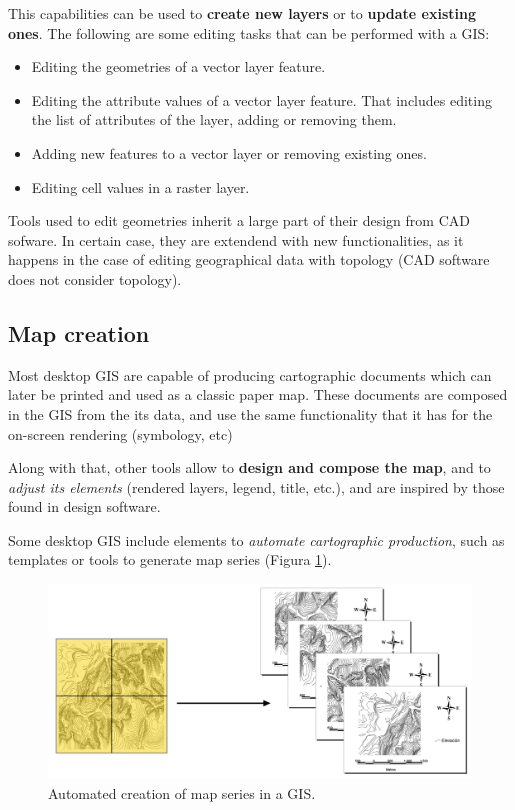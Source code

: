 This capabilities can be used to \textbf{create new layers} or to \textbf{update existing ones}. The following are some editing tasks that can be performed with a GIS:

\begin{itemize}
\item Editing the geometries of a vector layer feature.
\item Editing the attribute values of a vector layer feature. That includes editing the list of attributes of the layer, adding or removing them.
\item Adding new features to a vector layer or removing existing ones.
\item Editing cell values in a raster layer.
\end{itemize}

Tools used to edit geometries inherit a large part of their design from CAD sofware. In certain case, they are extendend with new functionalities, as it happens in the case of editing geographical data with topology (CAD software does not consider topology).


\subsection{Map creation}

Most desktop GIS are capable of producing cartographic documents which can later be printed and used as a classic paper map. These documents are composed in the GIS from the its data, and use the same functionality that it has for the on-screen rendering (symbology, etc)

Along with that, other tools allow to \textbf{design and compose the map}, and to \emph{adjust its elements} (rendered layers, legend, title, etc.), and are inspired by those found in design software. 

Some desktop GIS include elements to \emph{automate cartographic production}, such as templates or tools to generate map series (Figura \ref{Fig:Map_series}).

\begin{figure}[!hbt]
\centering
\includegraphics[width=\textwidth]{Software/Map_series.png}
\caption{\small Automated creation of map series in a GIS.}
\label{Fig:Map_series} 
\end{figure}

